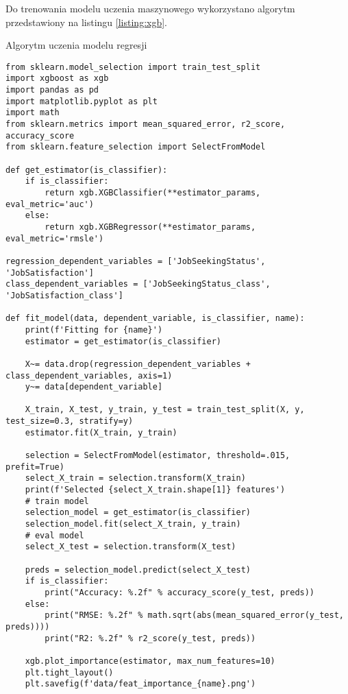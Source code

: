 Do trenowania modelu uczenia maszynowego wykorzystano algorytm przedstawiony na listingu \ref{listing:xgb}.

\begin{listing}[h!]
    \caption{Algorytm uczenia modelu regresji} \label{listing:xgb}
    \begin{verbatim}
from sklearn.model_selection import train_test_split
import xgboost as xgb
import pandas as pd
import matplotlib.pyplot as plt
import math
from sklearn.metrics import mean_squared_error, r2_score, accuracy_score
from sklearn.feature_selection import SelectFromModel

def get_estimator(is_classifier):
    if is_classifier:
        return xgb.XGBClassifier(**estimator_params, eval_metric='auc')
    else:
        return xgb.XGBRegressor(**estimator_params, eval_metric='rmsle')

regression_dependent_variables = ['JobSeekingStatus', 'JobSatisfaction']
class_dependent_variables = ['JobSeekingStatus_class', 'JobSatisfaction_class']

def fit_model(data, dependent_variable, is_classifier, name):
    print(f'Fitting for {name}')
    estimator = get_estimator(is_classifier)

    X~= data.drop(regression_dependent_variables + class_dependent_variables, axis=1)
    y~= data[dependent_variable]

    X_train, X_test, y_train, y_test = train_test_split(X, y, test_size=0.3, stratify=y)
    estimator.fit(X_train, y_train)

    selection = SelectFromModel(estimator, threshold=.015, prefit=True)
    select_X_train = selection.transform(X_train)
    print(f'Selected {select_X_train.shape[1]} features')
    # train model
    selection_model = get_estimator(is_classifier)
    selection_model.fit(select_X_train, y_train)
    # eval model
    select_X_test = selection.transform(X_test)

    preds = selection_model.predict(select_X_test)
    if is_classifier:
        print("Accuracy: %.2f" % accuracy_score(y_test, preds))
    else:
        print("RMSE: %.2f" % math.sqrt(abs(mean_squared_error(y_test, preds))))
        print("R2: %.2f" % r2_score(y_test, preds))

    xgb.plot_importance(estimator, max_num_features=10)
    plt.tight_layout()
    plt.savefig(f'data/feat_importance_{name}.png')
    \end{verbatim}
    \raggedright\source{\ownwork}
\end{listing}

